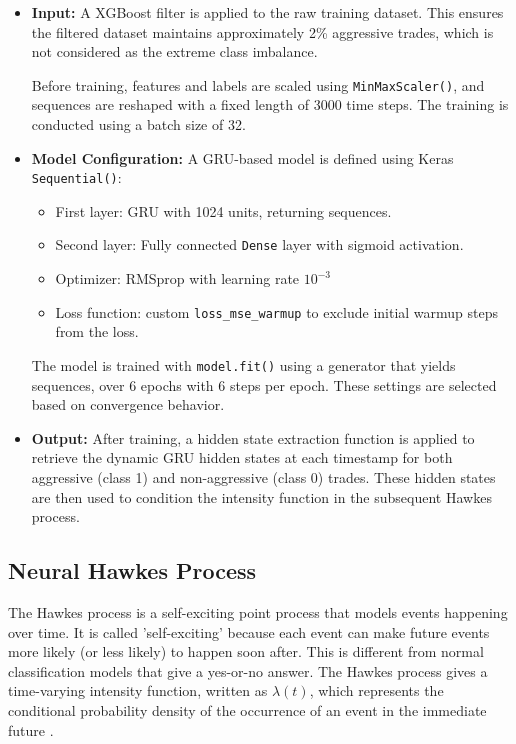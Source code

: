 \begin{itemize}
  \item \textbf{Input:}  
  A XGBoost filter is applied to the raw training dataset. This ensures the filtered dataset maintains approximately 2\% aggressive trades, which is not considered as the extreme class imbalance.

  Before training, features and labels are scaled using \texttt{MinMaxScaler()}, and sequences are reshaped with a fixed length of 3000 time steps. The training is conducted using a batch size of 32.

  \item \textbf{Model Configuration:}  
  A GRU-based model is defined using Keras \texttt{Sequential()}:
  \begin{itemize}
    \item First layer: GRU with 1024 units, returning sequences.
    \item Second layer: Fully connected \texttt{Dense} layer with sigmoid activation.
    \item Optimizer: RMSprop with learning rate $10^{-3}$
    \item Loss function: custom \texttt{loss\_mse\_warmup} to exclude initial warmup steps from the loss.
  \end{itemize}

  The model is trained with \texttt{model.fit()} using a generator that yields sequences, over 6 epochs with 6 steps per epoch. These settings are selected based on convergence behavior.

  \item \textbf{Output:}  
  After training, a hidden state extraction function is applied to retrieve the dynamic GRU hidden states at each timestamp for both aggressive (class 1) and non-aggressive (class 0) trades. These hidden states are then used to condition the intensity function in the subsequent Hawkes process.
\end{itemize}




\subsection{Neural Hawkes Process}
The Hawkes process is a self-exciting point process that models events happening over time. It is called 'self-exciting' because each event can make future events more likely (or less likely) to happen soon after. This is different from normal classification models that give a yes-or-no answer. The Hawkes process gives a time-varying intensity function, written as $\lambda(t)$, which represents the conditional probability density of the occurrence of an event in the immediate future \citep{bacry_hawkes_2015}. 

